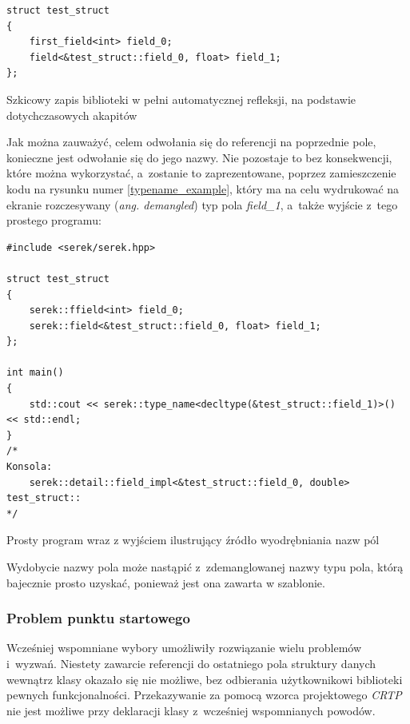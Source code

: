 \documentclass[12pt]{article}
\newcommand{\n}{\newline}
\newcommand{\nonpl}[1]{{\it #1}}
\newcommand{\code}[1]{{\it #1}}
\newcommand{\ang}[1]{\nonpl{ang. #1}}
\newcommand{\CRTP}{\nonpl{CRTP} }
\begin{document}
{{{				\begin{captioned}[H]
					\begin{lstlisting}[frame=single]
struct test_struct
{
	first_field<int> field_0;
	field<&test_struct::field_0, float> field_1;
};
					\end{lstlisting}
					\caption{ Szkicowy zapis biblioteki w pełni automatycznej refleksji, na podstawie dotychczasowych akapitów}
					\label{serek_summary}
				\end{captioned}


				Jak można zauważyć, celem odwołania się do referencji na poprzednie pole, konieczne jest odwołanie się do jego nazwy. Nie pozostaje to bez
				konsekwencji, które można wykorzystać, a~zostanie to zaprezentowane, poprzez zamieszczenie kodu na rysunku numer \ref{typename_example}, który
				ma na celu wydrukować na ekranie rozczesywany (\ang{demangled}) typ pola \code{field\_1}, a~także wyjście z~tego prostego programu:\n

				\begin{captioned}[H]
				\begin{lstlisting}[frame=single]
#include <serek/serek.hpp>

struct test_struct
{
	serek::ffield<int> field_0;
	serek::field<&test_struct::field_0, float> field_1;
};

int main()
{
	std::cout << serek::type_name<decltype(&test_struct::field_1)>() << std::endl;
}
/*
Konsola:
	serek::detail::field_impl<&test_struct::field_0, double> test_struct::
*/
				\end{lstlisting}
				\caption{ Prosty program wraz z wyjściem ilustrujący źródło wyodrębniania nazw pól}
				\label{typename_example}
			\end{captioned}

				Wydobycie nazwy pola może nastąpić z~zdemanglowanej nazwy typu pola, którą bajecznie prosto uzyskać, ponieważ jest ona zawarta
				w szablonie.
			}

			{
				\subsubsection{Problem punktu startowego}

				Wcześniej wspomniane wybory umożliwiły rozwiązanie wielu problemów i~wyzwań. Niestety zawarcie referencji do ostatniego pola
				struktury danych wewnątrz klasy okazało się nie możliwe, bez odbierania użytkownikowi biblioteki pewnych funkcjonalności.
				Przekazywanie za pomocą wzorca projektowego \CRTP nie jest możliwe przy deklaracji klasy z~wcześniej wspomnianych powodów.\n

}}}
\end{document}
